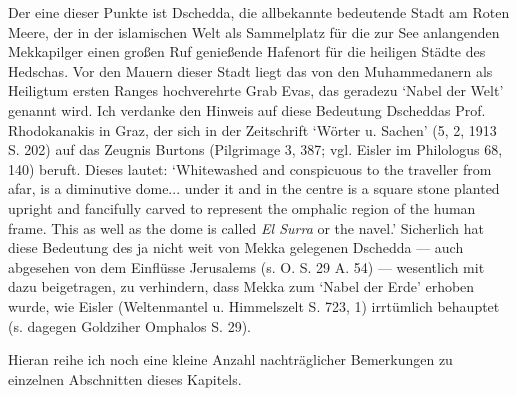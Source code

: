 \documentclass[a4paper, 11pt, oneside]{article}
\begin{document}
Der eine dieser Punkte ist Dschedda, die allbekannte bedeutende Stadt am Roten Meere, der in der islamischen Welt als Sammelplatz für die zur See anlangenden Mekkapilger einen großen Ruf genießende Hafenort für die heiligen Städte des Hedschas. Vor den Mauern dieser Stadt liegt das von den Muhammedanern als Heiligtum ersten Ranges hochverehrte Grab Evas, das geradezu `Nabel der Welt' genannt wird. Ich verdanke den Hinweis auf diese Bedeutung Dscheddas Prof. Rhodokanakis in Graz, der sich in der Zeitschrift `Wörter u. Sachen' (5, 2, 1913 S. 202) auf das Zeugnis Burtons (Pilgrimage 3, 387; vgl. Eisler im Philologus 68, 140) beruft. Dieses lautet: `Whitewashed and conspicuous to the traveller from afar, is a diminutive dome... under it and in the centre is a square stone planted upright and fancifully carved to represent the omphalic region of the human frame. This as well as the dome is called \emph{El Surra} or the navel.' Sicherlich hat diese Bedeutung des ja nicht weit von Mekka gelegenen Dschedda --- auch abgesehen von dem Einflüsse Jerusalems (s. O. S. 29 A. 54) --- wesentlich mit dazu beigetragen, zu verhindern, dass Mekka zum `Nabel der Erde' erhoben wurde, wie Eisler (Weltenmantel u. Himmelszelt S. 723, 1) irrtümlich behauptet (s. dagegen Goldziher Omphalos S. 29).

Hieran reihe ich noch eine kleine Anzahl nachträglicher Bemerkungen zu einzelnen Abschnitten dieses Kapitels.
\end{document}
